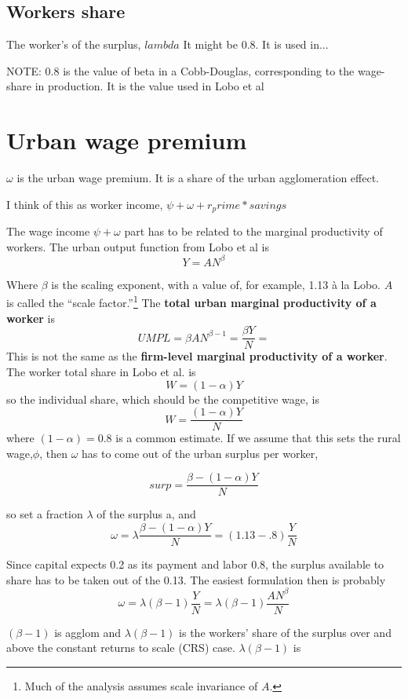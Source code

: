 \subsection{Workers share}
The worker's of the surplus, $lambda$ It might be 0.8. It is used in...

NOTE: 0.8 is the value of beta in a Cobb-Douglas, corresponding to the wage-share in production. It is the value used in Lobo et al

\section{Urban wage premium}

$\omega$ is the urban wage premium. It is a share of the urban agglomeration effect. 

I think of this as worker income, $\psi + \omega + r_prime*savings$ 

The wage income  $\psi + \omega$ part has to be related to the marginal productivity of workers. The urban output function from Lobo et al \cite{loboUrbanScalingProduction2013} is  
\begin{equation}Y=AN^\beta\label{LoboEqn2}\end{equation}

Where $\beta$  is the scaling exponent, with a value of,  for example, 1.13  \`a la 
Lobo. $A$ is called the ``scale factor.''\footnote{Much of the analysis assumes scale invariance of  $A$.}  The \textbf{total urban marginal productivity of a worker} is  
\[UMPL=\beta AN^{\beta-1}=\frac{\beta Y}{N} =\]
This is not the same as the \textbf{firm-level marginal productivity of a worker}. The worker total share in Lobo et al. is \[W= (1-\alpha)Y \] 
so the individual share, which should be the competitive wage, is
\[W= \frac{(1-\alpha)Y}{N} \] 
where $(1-\alpha)=0.8$ is a common estimate. If we assume that this sets the rural wage,$\phi$, then $\omega$ has to come out of the  urban surplus per worker,

\[surp= \frac{\beta -(1-\alpha)Y}{N} \] 

 so set a fraction $\lambda$ of the surplus a, and 
 \[\omega= \lambda\frac{\beta -(1-\alpha)Y}{N}= (1.13-.8) \frac{Y}{N} \] 

 Since capital expects 0.2 as its payment and labor 0.8, the surplus available to share has to be taken out of the 0.13. The easiest formulation then is probably 
 \[\omega= \lambda(\beta -1) \frac{Y}{N} =\lambda(\beta -1) \frac{AN^\beta}{N} \] 
 

$(\beta -1)$ is agglom and  $\lambda(\beta -1)$ is the workers' share of the surplus over and above the \gls{constant returns to scale} (CRS) case.   $\lambda(\beta -1)$ is 

